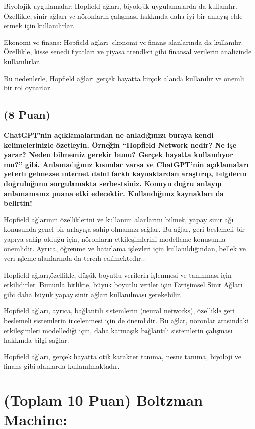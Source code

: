 \documentclass[11pt]{article}
\begin{document}
Biyolojik uygulamalar: Hopfield ağları, biyolojik uygulamalarda da kullanılır. Özellikle, sinir ağları ve nöronların çalışması hakkında daha iyi bir anlayış elde etmek için kullanılırlar.

Ekonomi ve finans: Hopfield ağları, ekonomi ve finans alanlarında da kullanılır. Özellikle, hisse senedi fiyatları ve piyasa trendleri gibi finansal verilerin analizinde kullanılırlar.

Bu nedenlerle, Hopfield ağları gerçek hayatta birçok alanda kullanılır ve önemli bir rol oynarlar.


\subsection{(8 Puan)} \textbf{ChatGPT’nin açıklamalarından ne anladığınızı buraya kendi kelimelerinizle özetleyin. Örneğin ``Hopfield Network nedir? Ne işe yarar? Neden bilmemiz gerekir bunu? Gerçek hayatta kullanılıyor mu?'' gibi. Anlamadığınız kısımlar varsa ve ChatGPT’nin açıklamaları yeterli gelmezse internet dahil farklı kaynaklardan araştırıp, bilgilerin doğruluğunu sorgulamakta serbestsiniz. Konuyu doğru anlayıp anlamamanız puana etki edecektir. Kullandığınız kaynakları da belirtin!}

Hopfield ağlarının özelliklerini ve kullanım alanlarını bilmek, yapay sinir ağı konusunda genel bir anlayışa sahip olmamızı sağlar. Bu ağlar, geri beslemeli bir yapıya sahip olduğu için, nöronların etkileşimlerini modelleme konusunda önemlidir. Ayrıca, öğrenme ve hatırlama işlevleri için kullanıldığından, bellek ve veri işleme alanlarında da tercih edilmektedir..

Hopfield ağları,özellikle, düşük boyutlu verilerin işlenmesi ve tanınması için etkilidirler. Bununla birlikte, büyük boyutlu veriler için Evrişimsel Sinir Ağları gibi daha büyük yapay sinir ağları kullanılması gerekebilir.

Hopfield ağları, ayrıca, bağlantılı sistemlerin (neural networks), özellikle geri beslemeli sistemlerin incelenmesi için de önemlidir. Bu ağlar, nöronlar arasındaki etkileşimleri modellediği için, daha karmaşık bağlantılı sistemlerin çalışması hakkında bilgi sağlar. 

Hopfield ağları, gerçek hayatta otik karakter tanıma, nesne tanıma, biyoloji ve finans gibi alanlarda kullanılmaktadır.

\section{(Toplam 10 Puan) Boltzman Machine:}
\end{document}
